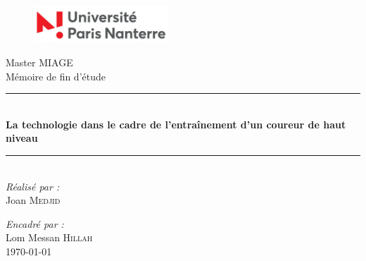 \documentclass[oneside,12pt]{book}
\def\Titre{La technologie dans le cadre de l'entraînement d'un coureur de haut niveau}
\def\Date{\today}
\begin{document}
\frontmatter
    \begin{titlepage}
        \begin{center}
        
            \begin{figure}
              \includegraphics[width=0.45\textwidth]{logo-nanterre}\\[2cm]
            \end{figure}
            
            
            {\LARGE Master MIAGE}\\[0.5cm]
            
            {\LARGE Mémoire de fin d'étude}\\[1.5cm]
            
            \rule{\linewidth}{0.5mm} \\[0.4cm]
            { \huge \bfseries \Titre \\[0.4cm] }
            \rule{\linewidth}{0.5mm} \\[2cm]
            
    
            \large{\emph{Réalisé par :}}\\
            Joan \textsc{Medjid}
            
            \vspace{1 cm}
        
            \emph{Encadré par :}\\
            Lom Messan \textsc{Hillah} \\[2cm]
        
        
            
             \Large{{\Date}}
        
        \end{center}
    \end{titlepage}
    

    
    \cleardoublepage
    
    \frontmatter
    \tableofcontents
    
    
    \mainmatter
     

    
    \appendix
   
    
    \backmatter
    
    
    
  \nocite{*}
\end{document}
